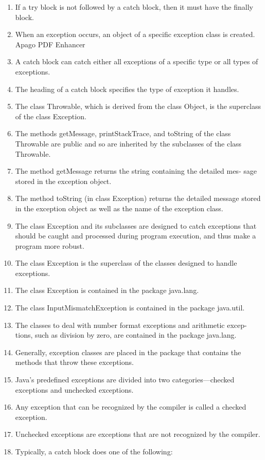 \documentclass[12pt,a4paper,final,twoside,onecolumn,titlepage]{book}
\begin{document}
\begin{enumerate}
\item If a try block is not followed by a catch block, then it must have the finally block.
\item When an exception occurs, an object of a specific exception class is created. Apago PDF Enhancer
\item A catch block can catch either all exceptions of a specific type or all types of exceptions.
\item The heading of a catch block specifies the type of exception it handles.
\item The class Throwable, which is derived from the class Object, is the superclass of the class Exception.
\item The methods getMessage, printStackTrace, and toString of the class Throwable are public and so are inherited by the subclasses of the class Throwable.
\item The method getMessage returns the string containing the detailed mes- sage stored in the exception object.
\item The method toString (in class Exception) returns the detailed message stored in the exception object as well as the name of the exception class.
\item The class Exception and its subclasses are designed to catch exceptions that should be caught and processed during program execution, and thus make a program more robust.
\item The class Exception is the superclass of the classes designed to handle exceptions.
\item The class Exception is contained in the package java.lang.
\item The class InputMismatchException is contained in the package java.util.
\item The classes to deal with number format exceptions and arithmetic excep- tions, such as division by zero, are contained in the package java.lang.
\item Generally, exception classes are placed in the package that contains the methods that throw these exceptions.
\item Java’s predefined exceptions are divided into two categories—checked exceptions and unchecked exceptions.
\item Any exception that can be recognized by the compiler is called a checked exception.
\item Unchecked exceptions are exceptions that are not recognized by the compiler.
\item Typically, a catch block does one of the following:

\end{enumerate}
\end{document}
